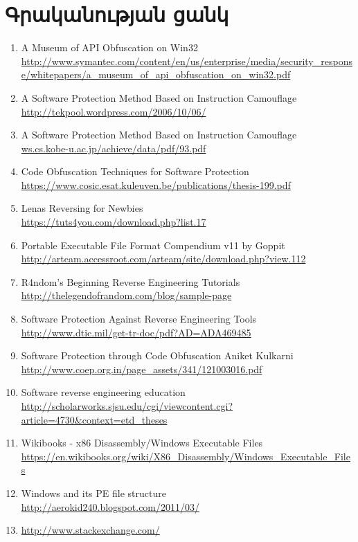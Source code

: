\documentclass[12pt]{article}
\begin{document}
\begin{sloppypar}
\newpage
\section*{Գրականության ցանկ}
\begin{enumerate}
\item A Museum of API Obfuscation on Win32\\
	\url{http://www.symantec.com/content/en/us/enterprise/media/security_response/whitepapers/a_museum_of_api_obfuscation_on_win32.pdf}
\item A Software Protection Method Based on Instruction Camouflage\\
	\url{http://tekpool.wordpress.com/2006/10/06/}
\item A Software Protection Method Based on Instruction Camouflage\\
	\url{ws.cs.kobe-u.ac.jp/achieve/data/pdf/93.pdf}
\item Code Obfuscation Techniques for Software Protection\\
	\url{https://www.cosic.esat.kuleuven.be/publications/thesis-199.pdf}
\item Lenas Reversing for Newbies\\
	\url{https://tuts4you.com/download.php?list.17}
\item Portable Executable File Format Compendium v11 by Goppit\\
	\url{http://arteam.accessroot.com/arteam/site/download.php?view.112}
\item R4ndom’s Beginning Reverse Engineering Tutorials\\
	\url{http://thelegendofrandom.com/blog/sample-page}
\item Software Protection Against Reverse Engineering Tools\\
	\url{http://www.dtic.mil/get-tr-doc/pdf?AD=ADA469485}
\item Software Protection through Code Obfuscation Aniket Kulkarni\\
	\url{http://www.coep.org.in/page_assets/341/121003016.pdf}
\item Software reverse engineering education\\
	\url{http://scholarworks.sjsu.edu/cgi/viewcontent.cgi?article=4730&context=etd_theses}
\item Wikibooks - x86 Disassembly/Windows Executable Files\\
	\url{https://en.wikibooks.org/wiki/X86_Disassembly/Windows_Executable_Files}
\item Windows and its PE file structure\\
	\url{http://aerokid240.blogspot.com/2011/03/}
\item \url{http://www.stackexchange.com/}
\end{enumerate}


\end{sloppypar}
\end{document}
